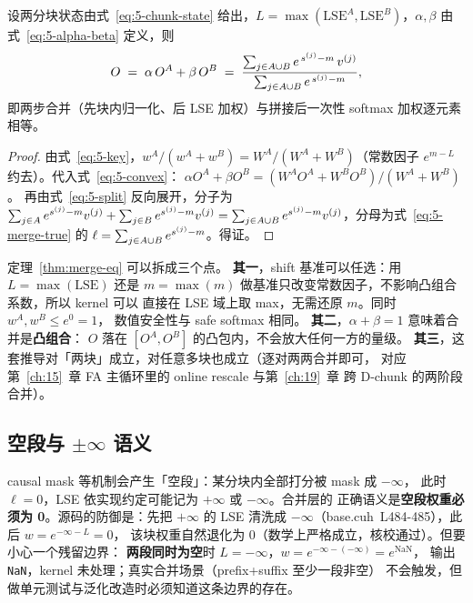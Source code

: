 \begin{theorem}\label{thm:merge-eq}
  设两分块状态由式~\ref{eq:5-chunk-state} 给出，$L = \max(\mathrm{LSE}^{A},
  \mathrm{LSE}^{B})$，$\alpha, \beta$ 由式~\ref{eq:5-alpha-beta} 定义，则
  \begin{equation}
    O \;=\; \alpha\, O^{A} + \beta\, O^{B}
      \;=\; \frac{\sum\sb{j \in A \cup B} e^{\,s^{(j)} - m}\, v^{(j)}}
                 {\sum\sb{j \in A \cup B} e^{\,s^{(j)} - m}} ,
    \label{eq:5-theorem}
  \end{equation}
  即两步合并（先块内归一化、后 LSE 加权）与拼接后一次性 softmax 加权逐元素相等。
\end{theorem}
\begin{proof}
  由式~\ref{eq:5-key}，$w^{A}/(w^{A}+w^{B}) = W^{A}/(W^{A}+W^{B})$（常数因子
  $e^{m-L}$ 约去）。代入式~\ref{eq:5-convex}：
  $\alpha O^{A} + \beta O^{B} = (W^{A} O^{A} + W^{B} O^{B})/(W^{A}+W^{B})$。
  再由式~\ref{eq:5-split} 反向展开，分子为
  $\sum\sb{j \in A} e^{s^{(j)}-m} v^{(j)} + \sum\sb{j \in B} e^{s^{(j)}-m} v^{(j)}
  = \sum\sb{j \in A \cup B} e^{s^{(j)}-m} v^{(j)}$，分母为式~\ref{eq:5-merge-true}
  的 $\ell = \sum\sb{j \in A \cup B} e^{s^{(j)}-m}$。得证。
\end{proof}

定理~\ref{thm:merge-eq} 可以拆成三个点。
\textbf{其一}，shift 基准可以任选：用 $L = \max(\mathrm{LSE})$ 还是
$m = \max(m)$ 做基准只改变常数因子，不影响凸组合系数，所以 kernel 可以
直接在 LSE 域上取 max，无需还原 $m$。同时 $w^{A}, w^{B} \le e^{0} = 1$，
数值安全性与 safe softmax 相同。
\textbf{其二}，$\alpha + \beta = 1$ 意味着合并是\textbf{凸组合}：
$O$ 落在 $[O^{A}, O^{B}]$ 的凸包内，不会放大任何一方的量级。
\textbf{其三}，这套推导对「两块」成立，对任意多块也成立（逐对两两合并即可，
对应第~\ref{ch:15}~章 FA 主循环里的 online rescale 与第~\ref{ch:19}~章
跨 D-chunk 的两阶段合并）。

\subsection{空段与 $\pm\infty$ 语义}

causal mask 等机制会产生「空段」：某分块内全部打分被 mask 成 $-\infty$，
此时 $\ell = 0$，LSE 依实现约定可能记为 $+\infty$ 或 $-\infty$。合并层的
正确语义是\textbf{空段权重必须为 0}。源码的防御是：先把 $+\infty$ 的 LSE
清洗成 $-\infty$（base.cuh~L484-485），此后 $w = e^{-\infty - L} = 0$，
该块权重自然退化为 0（数学上严格成立，核校通过）。但要小心一个残留边界：
\textbf{两段同时为空}时 $L = -\infty$，$w = e^{-\infty - (-\infty)} = e^{\mathrm{NaN}}$，
输出 \texttt{NaN}，kernel 未处理；真实合并场景（prefix+suffix 至少一段非空）
不会触发，但做单元测试与泛化改造时必须知道这条边界的存在。

